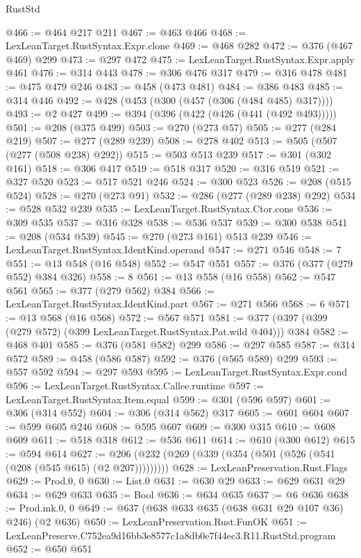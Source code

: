 \begin{lexlean}{RustStd}
\begin{coremodule}
@466 := @464 @217 @211
@467 := @463 @466
@468 := LexLeanTarget.RustSyntax.Expr.clone
@469 := @468 @282
@472 := @376 (@467 @469) @299
@473 := @297 @472
@475 := LexLeanTarget.RustSyntax.Expr.apply @461
@476 := @314 @443
@478 := @306 @476 @317
@479 := @316 @478
@481 := @475 @479 @246
@483 := @458 (@473 @481)
@484 := @386 @483
@485 := @314 @446
@492 := @428 (@453 (@300 (@457 (@306 (@484 @485) @317))))
@493 := @2 @427
@499 := @394 (@396 (@422 (@426 (@441 (@492 @493)))))
@501 := @208 (@375 @499)
@503 := @270 (@273 @57)
@505 := @277 (@284 @219)
@507 := @277 (@289 @239)
@508 := @278 @402
@513 := @505 (@507 (@277 (@508 @238) @292))
@515 := @503 @513 @239
@517 := @301 (@302 @161)
@518 := @306 @417
@519 := @518 @317
@520 := @316 @519
@521 := @327 @520
@523 := @517 @521 @246
@524 := @300 @523
@526 := @208 (@515 @524)
@528 := @270 (@273 @91)
@532 := @286 (@277 (@289 @238) @292)
@534 := @528 @532 @239
@535 := LexLeanTarget.RustSyntax.Ctor.cons
@536 := @309 @535
@537 := @316 @328
@538 := @536 @537
@539 := @300 @538
@541 := @208 (@534 @539)
@545 := @270 (@273 @161) @513 @239
@546 := LexLeanTarget.RustSyntax.IdentKind.operand
@547 := @271 @546
@548 := 7
@551 := @13 @548 (@16 @548)
@552 := @547 @551
@557 := @376 (@377 (@279 @552) @384 @326)
@558 := 8
@561 := @13 @558 (@16 @558)
@562 := @547 @561
@565 := @377 (@279 @562) @384
@566 := LexLeanTarget.RustSyntax.IdentKind.part
@567 := @271 @566
@568 := 6
@571 := @13 @568 (@16 @568)
@572 := @567 @571
@581 := @377 (@397 (@399 (@279 @572) (@399 LexLeanTarget.RustSyntax.Pat.wild @404))) @384
@582 := @468 @401
@585 := @376 (@581 @582) @299
@586 := @297 @585
@587 := @314 @572
@589 := @458 (@586 @587)
@592 := @376 (@565 @589) @299
@593 := @557 @592
@594 := @297 @593
@595 := LexLeanTarget.RustSyntax.Expr.cond
@596 := LexLeanTarget.RustSyntax.Callee.runtime
@597 := LexLeanTarget.RustSyntax.Item.equal
@599 := @301 (@596 @597)
@601 := @306 (@314 @552)
@604 := @306 (@314 @562) @317
@605 := @601 @604
@607 := @599 @605 @246
@608 := @595 @607
@609 := @300 @315
@610 := @608 @609
@611 := @518 @318
@612 := @536 @611
@614 := @610 (@300 @612)
@615 := @594 @614
@627 := @206 (@232 (@269 (@339 (@354 (@501 (@526 (@541 (@208 (@545 @615) (@2 @207)))))))))
@628 := LexLeanPreservation.Rust.Flags
@629 := Prod.{0, 0}
@630 := List.{0}
@631 := @630 @29
@633 := @629 @631 @29
@634 := @629 @633
@635 := Bool
@636 := @634 @635
@637 := @6 @636
@638 := Prod.mk.{0, 0}
@649 := @637 (@638 @633 @635 (@638 @631 @29 @107 @36) @246) (@2 @636)
@650 := LexLeanPreservation.Rust.FunOK
@651 := LexLeanPreserve.C752ea9d16bb3e8577c1a8db0e7f44ec3.R11.RustStd.program
@652 := @650 @651

\end{coremodule}
\end{lexlean}
